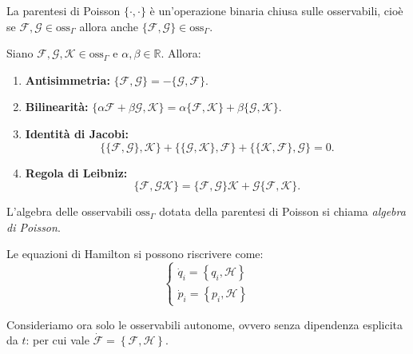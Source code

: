 \begin{remark}
    La parentesi di Poisson $\{\cdot,\cdot\}$ è un'operazione binaria chiusa sulle osservabili, cioè se 
    $\mathcal{F},\mathcal{G}\in\text{oss}_\Gamma$ allora anche $\{\mathcal{F},\mathcal{G}\}\in\text{oss}_\Gamma$.
\end{remark}

\begin{proposition}
Siano $\mathcal{F},\mathcal{G},\mathcal{K}\in \text{oss}_\Gamma$ e $\alpha,\beta\in\mathbb{R}$. Allora:
\begin{enumerate}[label=(\roman*)]
    \item \textbf{Antisimmetria:} $\{\mathcal{F},\mathcal{G}\}= -\{\mathcal{G},\mathcal{F}\}$.
    \item \textbf{Bilinearità:} $\{\alpha \mathcal{F}+\beta \mathcal{G},\mathcal{K}\}= \alpha\{\mathcal{F},\mathcal{K}\}+\beta\{\mathcal{G},\mathcal{K}\}$.
    \item \textbf{Identità di Jacobi:} 
    \[
        \{\{\mathcal{F},\mathcal{G}\},\mathcal{K}\}+ \{\{\mathcal{G},\mathcal{K}\},\mathcal{F}\}+ \{\{\mathcal{K},\mathcal{F}\},\mathcal{G}\}=0.
    \]
    \item \textbf{Regola di Leibniz:} 
    \[
        \{\mathcal{F},\mathcal{G}\mathcal{K}\}=\{\mathcal{F},\mathcal{G}\}\mathcal{K}+\mathcal{G}\{\mathcal{F},\mathcal{K}\}.
    \]
\end{enumerate}
\end{proposition}

\begin{definition}
    L'algebra delle osservabili $\text{oss}_\Gamma$ dotata della parentesi di Poisson si chiama \textit{algebra di Poisson}.
\end{definition}

\begin{remark}
    Le equazioni di Hamilton si possono riscrivere come:
    \begin{equation}
        \begin{cases}
            \dot{q}_i = \left\{ q_i,\mathcal{H} \right\}\\
            \dot{p}_i = \left\{ p_i,\mathcal{H} \right\}
        \end{cases}
    \end{equation}
\end{remark}

Consideriamo ora solo le osservabili autonome, ovvero senza dipendenza esplicita
 da $t$: per cui vale $\dot{\mathcal{F}}= \left\{ \mathcal{F},\mathcal{H} \right\}$.

